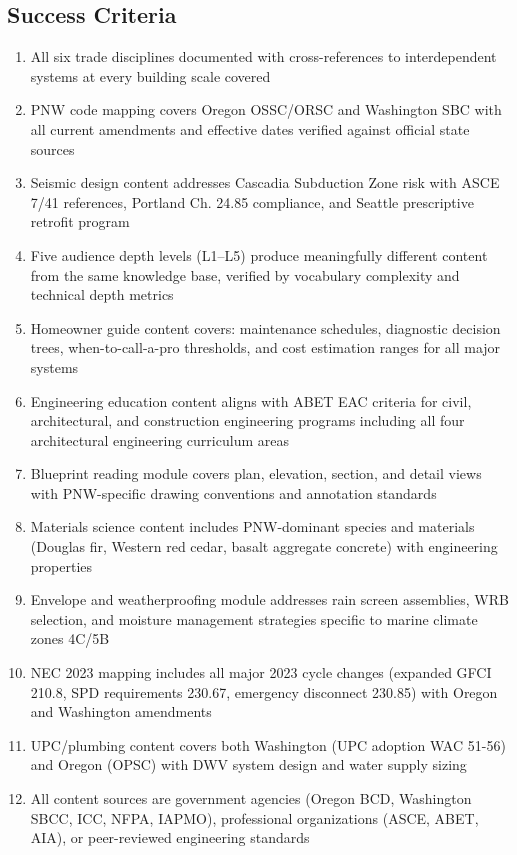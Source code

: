 \documentclass[11pt,letterpaper]{article}
\begin{document}
\subsection{Success Criteria}

\begin{enumerate}[leftmargin=2em]
\item All six trade disciplines documented with cross-references to interdependent systems at every building scale covered
\item PNW code mapping covers Oregon OSSC/ORSC and Washington SBC with all current amendments and effective dates verified against official state sources
\item Seismic design content addresses Cascadia Subduction Zone risk with ASCE 7/41 references, Portland Ch. 24.85 compliance, and Seattle prescriptive retrofit program
\item Five audience depth levels (L1--L5) produce meaningfully different content from the same knowledge base, verified by vocabulary complexity and technical depth metrics
\item Homeowner guide content covers: maintenance schedules, diagnostic decision trees, when-to-call-a-pro thresholds, and cost estimation ranges for all major systems
\item Engineering education content aligns with ABET EAC criteria for civil, architectural, and construction engineering programs including all four architectural engineering curriculum areas
\item Blueprint reading module covers plan, elevation, section, and detail views with PNW-specific drawing conventions and annotation standards
\item Materials science content includes PNW-dominant species and materials (Douglas fir, Western red cedar, basalt aggregate concrete) with engineering properties
\item Envelope and weatherproofing module addresses rain screen assemblies, WRB selection, and moisture management strategies specific to marine climate zones 4C/5B
\item NEC 2023 mapping includes all major 2023 cycle changes (expanded GFCI 210.8, SPD requirements 230.67, emergency disconnect 230.85) with Oregon and Washington amendments
\item UPC/plumbing content covers both Washington (UPC adoption WAC 51-56) and Oregon (OPSC) with DWV system design and water supply sizing
\item All content sources are government agencies (Oregon BCD, Washington SBCC, ICC, NFPA, IAPMO), professional organizations (ASCE, ABET, AIA), or peer-reviewed engineering standards
\end{enumerate}
\end{document}
